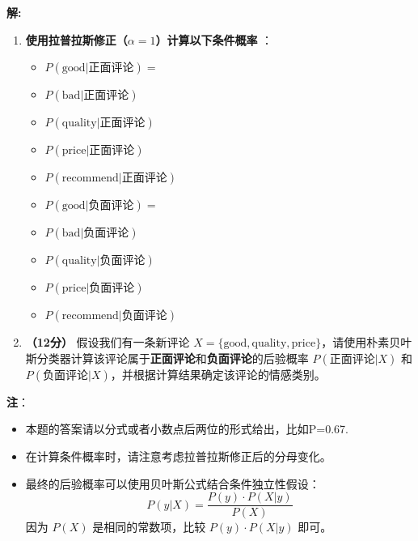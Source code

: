 \documentclass[8pt]{article}
\begin{document}
\textbf{\large 解:}

\begin{enumerate}
    \item \textbf{使用\textbf{拉普拉斯修正}（\(\alpha = 1\)）计算以下条件概率} ：
        \begin{itemize}
            \item \( 
                P(\text{good} | \text{正面评论}) = 
                \frac{}{}
            \)
            \item \( P(\text{bad} | \text{正面评论}) \)
            \item \( P(\text{quality} | \text{正面评论}) \)
            \item \( P(\text{price} | \text{正面评论}) \)
            \item \( P(\text{recommend} | \text{正面评论}) \)
        \end{itemize}
        \begin{itemize}
            \item \( 
                P(\text{good} | \text{负面评论}) = 
                \frac{}{}
            \)
            \item \( P(\text{bad} | \text{负面评论}) \)
            \item \( P(\text{quality} | \text{负面评论}) \)
            \item \( P(\text{price} | \text{负面评论}) \)
            \item \( P(\text{recommend} | \text{负面评论}) \)
        \end{itemize}

    \item \textbf{（12分）} 假设我们有一条新评论 \( X = \{\text{good}, \text{quality}, \text{price}\} \)，请使用朴素贝叶斯分类器计算该评论属于\textbf{正面评论}和\textbf{负面评论}的后验概率 \( P(\text{正面评论} | X) \) 和 \( P(\text{负面评论} | X) \)，并根据计算结果确定该评论的情感类别。
\end{enumerate}

\textbf{注}：
\begin{itemize}
    \item 本题的答案请以分式或者小数点后两位的形式给出，比如P=0.67.
    \item 在计算条件概率时，请注意考虑拉普拉斯修正后的分母变化。
    \item 最终的后验概率可以使用贝叶斯公式结合条件独立性假设：
    \[
    P(y|X) = \frac{P(y) \cdot P(X|y)}{P(X)}
    \]
    因为 \( P(X) \) 是相同的常数项，比较 \( P(y) \cdot P(X|y) \) 即可。
\end{itemize}
\end{document}
